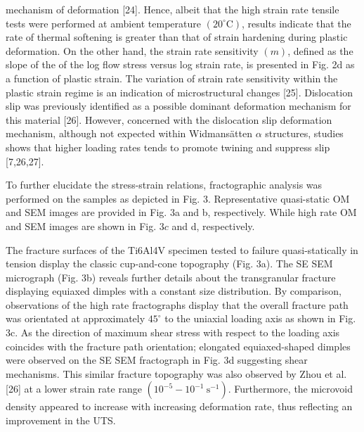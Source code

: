 \documentclass[10pt]{article}
\begin{document}
mechanism of deformation [24]. Hence, albeit that the high strain rate tensile tests were performed at ambient temperature $\left(20^{\circ} \mathrm{C}\right)$, results indicate that the rate of thermal softening is greater than that of strain hardening during plastic deformation. On the other hand, the strain rate sensitivity $(m)$, defined as the slope of the of the log flow stress versus log strain rate, is presented in Fig. 2d as a function of plastic strain. The variation of strain rate sensitivity within the plastic strain regime is an indication of microstructural changes [25]. Dislocation slip was previously identified as a possible dominant deformation mechanism for this material [26]. However, concerned with the dislocation slip deformation mechanism, although not expected within Widmansätten $\alpha$ structures, studies shows that higher loading rates tends to promote twining and suppress slip [7,26,27].

To further elucidate the stress-strain relations, fractographic analysis was performed on the samples as depicted in Fig. 3. Representative quasi-static OM and SEM images are provided in Fig. 3a and b, respectively. While high rate OM and SEM images are shown in Fig. $3 c$ and d, respectively.

The fracture surfaces of the Ti6Al4V specimen tested to failure quasi-statically in tension display the classic cup-and-cone topography (Fig. 3a). The SE SEM micrograph (Fig. 3b) reveals further details about the transgranular fracture displaying equiaxed dimples with a constant size distribution. By comparison, observations of the high rate fractographs display that the overall fracture path was orientated at approximately $45^{\circ}$ to the uniaxial loading axis as shown in Fig. 3c. As the direction of maximum shear stress with respect to the loading axis coincides with the fracture path orientation; elongated equiaxed-shaped dimples were observed on the SE SEM fractograph in Fig. 3d suggesting shear mechanisms. This similar fracture topography was also observed by Zhou et al. [26] at a lower strain rate range $\left(10^{-5}-10^{-1} \mathrm{~s}^{-1}\right)$. Furthermore, the microvoid density appeared to increase with increasing deformation rate, thus reflecting an improvement in the UTS.
\end{document}

